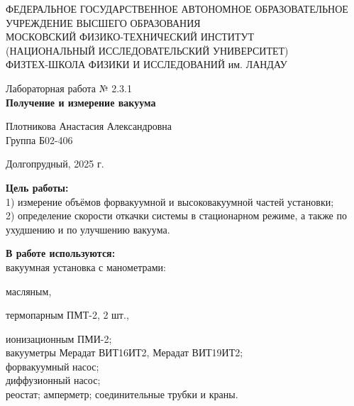 \documentclass[a4paper,12pt]{article} %
\begin{document}
\begin{center}
	\footnotesize{ФЕДЕРАЛЬНОЕ ГОСУДАРСТВЕННОЕ АВТОНОМНОЕ ОБРАЗОВАТЕЛЬНОЕ 			УЧРЕЖДЕНИЕ ВЫСШЕГО ОБРАЗОВАНИЯ}\\
	\footnotesize{МОСКОВСКИЙ ФИЗИКО-ТЕХНИЧЕСКИЙ ИНСТИТУТ\\(НАЦИОНАЛЬНЫЙ 			ИССЛЕДОВАТЕЛЬСКИЙ УНИВЕРСИТЕТ)}\\
	\footnotesize{ФИЗТЕХ-ШКОЛА ФИЗИКИ И ИССЛЕДОВАНИЙ им. ЛАНДАУ\\}
	\hfill \break
	\hfill \break
	\hfill \break
	\hfill \break
\end{center}

\begin{center}   
    \hfill \break
	\hfill \break
	\hfill \break
	\hfill \break    \hfill \break
	\hfill \break
	\hfill \break
	\hfill \break
    \hfill \break
    \hfill \break
	\hfill \break
	\large{Лабораторная работа № 2.3.1 \\\textbf{Получение и измерение вакуума}}\\
	\begin{flushright}
		Плотникова Анастасия Александровна\\
		Группа Б02-406
	\end{flushright}
	\hfill \break
	\hfill \break
	\hfill \break
\end{center}
\hfill \break
\hfill \break
\hfill \break
\hfill \break
\hfill \break
\hfill \break
\hfill \break
\hfill \break
\hfill \break
\hfill \break
\hfill \break
\hfill \break
\hfill \break
\begin{center}
	Долгопрудный, 2025 г.
\end{center}
\thispagestyle{empty}
\newpage
	\textbf{Цель работы:}\\ 
  1) измерение объёмов форвакуумной и высоковакуумной частей установки; \\
  2) определение скорости откачки системы в стационарном режиме, а также по ухудшению и по улучшению вакуума.
	\hfill \break
	
	\textbf{В работе используются:}\\ 
  вакуумная установка с манометрами: 
  \par масляным,
  \par термопарным ПМТ-2, 2 шт.,
  \par ионизационным ПМИ-2; \\
  вакууметры Мерадат ВИТ16ИТ2, Мерадат ВИТ19ИТ2; \\
  форвакуумный насос; \\
  диффузионный насос; \\
  реостат;
  амперметр;
  соединительные трубки и краны.
	
\end{document}
